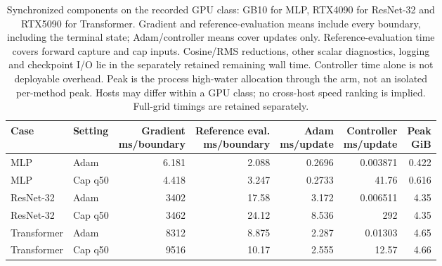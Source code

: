 \begin{table}[H]
\centering\small
\setlength{\tabcolsep}{4pt}
\begin{tabular}{llrrrrr}
\toprule
Case & Setting & \shortstack{Gradient\\ms/boundary} & \shortstack{Reference eval.\\ms/boundary} & \shortstack{Adam\\ms/update} & \shortstack{Controller\\ms/update} & \shortstack{Peak\\GiB} \\
\midrule
MLP & Adam & 6.181 & 2.088 & 0.2696 & 0.003871 & 0.422 \\
MLP & Cap q50 & 4.418 & 3.247 & 0.2733 & 41.76 & 0.616 \\
ResNet-32 & Adam & 3402 & 17.58 & 3.172 & 0.006511 & 4.35 \\
ResNet-32 & Cap q50 & 3462 & 24.12 & 8.536 & 292 & 4.35 \\
Transformer & Adam & 8312 & 8.875 & 2.287 & 0.01303 & 4.65 \\
Transformer & Cap q50 & 9516 & 10.17 & 2.555 & 12.57 & 4.66 \\
\bottomrule
\end{tabular}
\caption{Synchronized components on the recorded GPU class: GB10 for MLP, RTX4090 for ResNet-32 and RTX5090 for Transformer. Gradient and reference-evaluation means include every boundary, including the terminal state; Adam/controller means cover updates only. Reference-evaluation time covers forward capture and cap inputs. Cosine/RMS reductions, other scalar diagnostics, logging and checkpoint I/O lie in the separately retained remaining wall time. Controller time alone is not deployable overhead. Peak is the process high-water allocation through the arm, not an isolated per-method peak. Hosts may differ within a GPU class; no cross-host speed ranking is implied. Full-grid timings are retained separately.}
\end{table}
